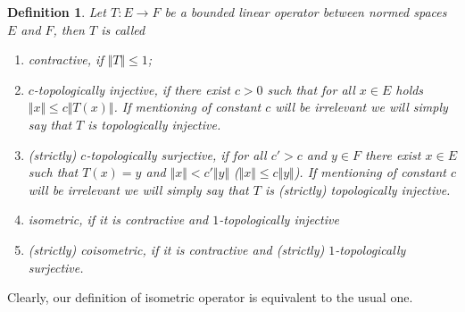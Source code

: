 \documentclass[12pt]{article}
\newtheorem{definition}[theorem]{Definition}
\begin{document}
\begin{definition}\label{DefNorOpType} Let $ T:E\to F$ be a bounded linear
operator between normed spaces $E$ and $F$, then $ T$ is called
\begin{enumerate}[label = (\roman*)]
    \item contractive, if $\Vert T\Vert\leq 1$;

    \item \textit{$c$-topologically injective}, if there exist $c > 0$ 
    such that for all $x \in E$ holds $\Vert x\Vert\leq c\Vert  T(x)\Vert$. 
    If mentioning of constant $c$ will be irrelevant we will simply say 
    that $ T$ is topologically injective.

    \item \textit{(strictly) $c$-topologically surjective}, if for 
    all $c'>c$ and $y\in F$ there exist $x \in E$ such that 
    $ T(x) = y$ and $\Vert x \Vert < c' \Vert y \Vert$ 
    ($\Vert x \Vert \leq c \Vert y \Vert$). If mentioning of constant $c$
    will be irrelevant we will simply say that $ T$ is (strictly) topologically
    injective.

    \item isometric, if it is contractive and $1$-topologically injective

    \item (strictly) coisometric, if it is contractive and (strictly) 
    $1$-topologically surjective.
\end{enumerate}
\end{definition}

Clearly, our definition of isometric operator is equivalent to the usual one.
\end{document}
